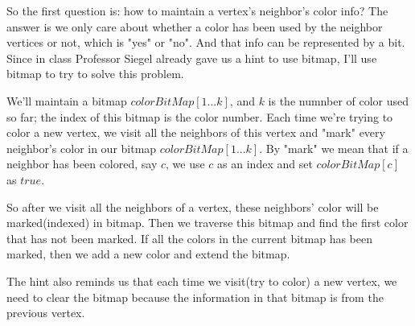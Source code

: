 \documentclass[a4paper,11pt]{article}
\theoremstyle{mytheor}
\begin{document}
So the first question is: how to maintain a vertex's neighbor's color info? The answer is we only care about whether a color has been used by the neighbor vertices or not, which is "yes" or "no". And that info can be represented by a bit. Since in class Professor Siegel already gave us a hint to use bitmap, I'll use bitmap to try to solve this problem. 

We'll maintain a bitmap $colorBitMap[1...k]$, and $k$ is the numnber of color used so far; the index of this bitmap is the color number. Each time we're trying to color a new vertex, we visit all the neighbors of this vertex and "mark" every neighbor's color in our bitmap $colorBitMap[1...k]$. By "mark" we mean that if a neighbor has been colored, say $c$, we use $c$ as an index and set $colorBitMap[c]$ as $true$.

So after we visit all the neighbors of a vertex, these neighbors' color will be marked(indexed) in bitmap. Then we traverse this bitmap and find the first color that has not been marked. If all the colors in the current bitmap has been marked, then we add a new color and extend the bitmap.

The hint also reminds us that each time we visit(try to color) a new vertex, we need to clear the bitmap because the information in that bitmap is from the previous vertex.

\iffalse
\begin{lstlisting}[label={list:ninth1},caption=another approach to color]
procedure color2(n, Neighbors[1..n], ColorOf[1...n]);
  create the link list Uncolored and insert each vertex into this list;
  create an empty element color bitmap;
  while Uncolored is not empty:
        foreach vertext v in Uncolored:
            foreach element CBM[i] in bitmap CBM:
                CBM[i] = false;
            endfor
            foreach neighbor w in the neighbor list of v:
                if w has been colored:
                    CBM[color of v] = true;
                endif
            endfor
            foreach element CBM[i] in bitmap CBM:
                if CBM[i] is false:
                    remove v from colorable;
                    ColorOf[v] = i
                endif
            endfor
            if bitmap CBM is empty or all the elements in it has been\ marked as true:
                pick a new color c;
                remove v from colorable;
                ColorOf[v] = c;
                extend the size of bitmap CBM by 1;
            endif
        endfor
  endwhile
\end{lstlisting}
\fi
\end{document}
